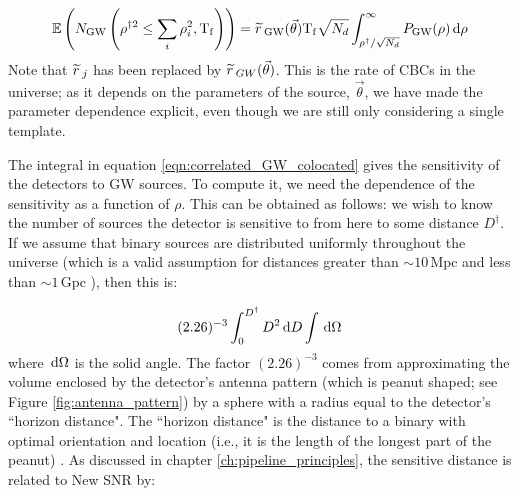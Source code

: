 \begin{equation}
\label{eqn:correlated_GW_colocated}
\Exptd\left(N_{\mathrm{GW}} \left(\rho^{\dagger2} \leq  \sum_i\rho_i^2, \Tf \right) \right) = \rsrc_{\mathrm{GW}}(\vec{\theta}) \Tf \sqrt{N_d} \int_{\rho^\dagger/\sqrt{N_d}}^{\infty} P_{\mathrm{GW}}(\rho) \d \rho
\end{equation}
Note that $\widetilde{r}\,_{j}$ has been replaced by $\widetilde{r}\,_{GW}(\vec{\theta})$. This is the rate of \acp{CBC} in the universe; as it depends on the parameters of the source, $\vec{\theta}$, we have made the parameter dependence explicit, even though we are still only considering a single template.

The integral in equation \ref{eqn:correlated_GW_colocated} gives the sensitivity of the detectors to \ac{GW} sources. To compute it, we need the dependence of the sensitivity as a function of $\rho$. This can be obtained as follows: we wish to know the number of sources the detector is sensitive to from here to some distance $D^\dagger$. If we assume that binary sources are distributed uniformly throughout the universe (which is a valid assumption for distances greater than $\sim10\,\mathrm{Mpc}$ and less than $\sim1\,\mathrm{Gpc}$ \cite{ratesdoc}), then this is:

\begin{equation}
(2.26)^{-3} \int_{0}^{D^\dagger} D^2 \,\mathrm{d} D \int \,\mathrm{d}\Omega
\end{equation}
where $\,\mathrm{d}\Omega$ is the solid angle. The factor $(2.26)^{-3}$ comes from approximating the volume enclosed by the detector's antenna pattern (which is peanut shaped; see Figure \ref{fig:antenna_pattern}) by a sphere with a radius equal to the detector's ``horizon distance". The ``horizon distance" is the distance to a binary with optimal orientation and location (i.e., it is the length of the longest part of the peanut) \cite{FinnChernoff:1993}. As discussed in chapter \ref{ch:pipeline_principles}, the sensitive distance is related to New \ac{SNR} by:

